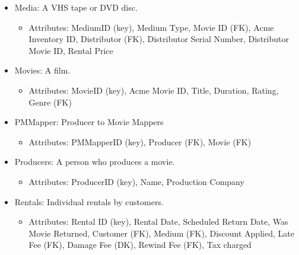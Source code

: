 \documentclass[letterpaper,12pt]{article}
\begin{document}
\begin{itemize}
\begin{itemize}
	      \end{itemize}
	\item Media: A VHS tape or DVD disc.
	      \begin{itemize}
		      \item Attributes: MediumID (key), Medium Type, Movie ID (FK), Acme Inventory ID, Distributor (FK), Distributor Serial Number, Distributor Movie ID, Rental Price
	      \end{itemize}
	\item Movies: A film.
	      \begin{itemize}
		      \item Attributes: MovieID (key), Acme Movie ID, Title, Duration, Rating, Genre (FK)
	      \end{itemize}
	\item PMMapper: Producer to Movie Mappers
	      \begin{itemize}
		      \item Attributes: PMMapperID (key), Producer (FK), Movie (FK)
	      \end{itemize}
	\item Producers: A person who produces a movie.
	      \begin{itemize}
		      \item Attributes: ProducerID (key), Name, Production Company
	      \end{itemize}
	\item Rentals: Individual rentals by customers.
	      \begin{itemize}
		      \item Attributes: Rental ID (key), Rental Date, Scheduled Return Date, Was Movie Returned, Customer (FK), Medium (FK), Discount Applied, Late Fee (FK), Damage Fee (DK), Rewind Fee (FK), Tax charged
	      \end{itemize}
\end{itemize}
\end{document}
